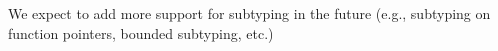 We expect to add more support for subtyping in the future (e.g.,
subtyping on function pointers, bounded subtyping, etc.)



